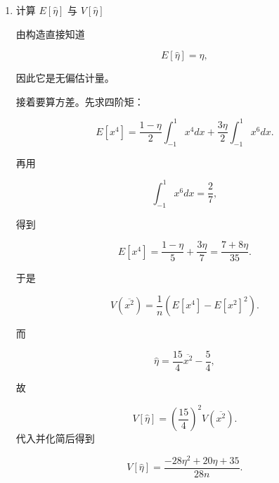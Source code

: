 \begin{question}
\begin{solution}
\begin{enumerate}
\item 计算 \(E[\hat\eta]\) 与 \(V[\hat\eta]\)

由构造直接知道

\[
E[\hat\eta]=\eta,
\]

因此它是无偏估计量。

接着要算方差。先求四阶矩：

\[
E[x^4]=\frac{1-\eta}{2}\int_{-1}^1 x^4dx + \frac{3\eta}{2}\int_{-1}^1 x^6dx.
\]

再用

\[
\int_{-1}^1 x^6dx=\frac27,
\]

得到

\[
E[x^4]=\frac{1-\eta}{5}+\frac{3\eta}{7}=\frac{7+8\eta}{35}.
\]

于是

\[
V(\overline{x^2})=\frac1n\left(E[x^4]-E[x^2]^2\right).
\]

而

\[
\hat\eta = \frac{15}{4}\overline{x^2}-\frac54,
\]

故

\[
V[\hat\eta]=\left(\frac{15}{4}\right)^2 V(\overline{x^2}).
\]
代入并化简后得到

\[
V[\hat\eta]=\frac{-28\eta^2+20\eta+35}{28n}.
\]
\end{enumerate}
\end{solution}
\end{question}

